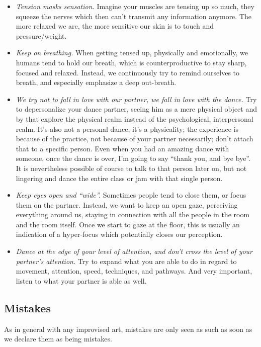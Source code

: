 \begin{itemize}
    \item \textit{Tension masks sensation.} Imagine your muscles are tensing up so much, they squeeze the nerves which then can't transmit any information anymore.
    The more relaxed we are, the more sensitive our skin is to touch and pressure/weight.
    \item \textit{Keep on breathing.} When getting tensed up, physically and emotionally, we humans tend to hold our breath, which is counterproductive to stay sharp, focused and relaxed.
    Instead, we continuously try to remind ourselves to breath, and especially emphasize a deep out-breath.
    \item \textit{We try not to fall in love with our partner, we fall in love with the dance.} Try to depersonalize your dance partner, seeing him as a mere physical object and by that explore the physical realm instead of the psychological, interpersonal realm.
    It's also not a personal dance, it's a physicality; the experience is because of the practice, not because of your partner necessarily; don't attach that to a specific person.
    Even when you had an amazing dance with someone, once the dance is over, I'm going to say ``thank you, and bye bye''.
    It is nevertheless possible of course to talk to that person later on, but not lingering and dance the entire class or jam with that single person.
    \item \textit{Keep eyes open and ``wide''.} Sometimes people tend to close them, or focus them on the partner.
    Instead, we want to keep an open gaze, perceiving everything around us, staying in connection with all the people in the room and the room itself.
    Once we start to gaze at the floor, this is usually an indication of a hyper-focus which potentially closes our perception.
    \item \textit{Dance at the edge of your level of attention, and don't cross the level of your partner's attention.} Try to expand what you are able to do in regard to movement, attention, speed, techniques, and pathways.
    And very important, listen to what your partner is able as well.
\end{itemize}

\subsection{Mistakes}\label{subsec:mistakes}

As in general with any improvised art, mistakes are only seen as such as soon as we declare them as being mistakes.

